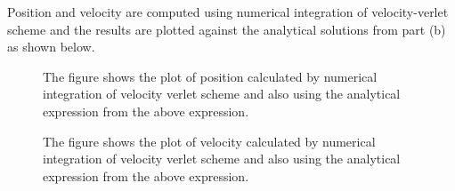 \documentclass{article}
\begin{document}
Position and velocity are computed using numerical integration of velocity-verlet scheme and the results are plotted against the analytical solutions from part (b) as shown below.
\begin{figure}[H]
\begin{centering}
\caption{The figure shows the plot of position calculated by numerical integration of velocity verlet scheme and also using the analytical expression from the above expression.}
\end{centering}
\end{figure}

\begin{figure}[H]
\begin{centering}
\caption{The figure shows the plot of velocity calculated by numerical integration of velocity verlet scheme and also using the analytical expression from the above expression.}
\end{centering}
\end{figure}
\end{document}
